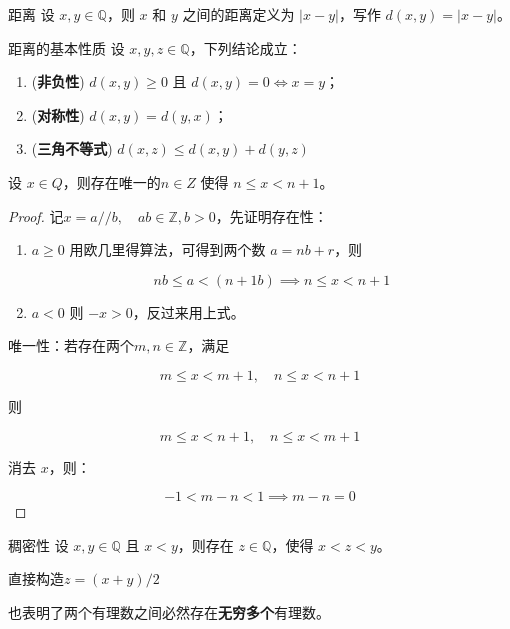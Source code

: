 \begin{definition}{距离}{}
	设 $x,y\in \mathbb Q$，则 $x$ 和 $y$ 之间的距离定义为 $|x-y|$，写作 $d(x,y)=|x-y|$。
\end{definition}

\begin{theorem}{距离的基本性质}{}
	设 $x,y,z\in \mathbb Q$，下列结论成立：
	\begin{enumerate}
		\item (\textbf{非负性}) $d(x,y)\ge 0$ 且 $d(x,y)=0\iff x=y$；
		\item (\textbf{对称性}) $d(x,y) = d(y,x)$；
		\item (\textbf{三角不等式}) $d(x,z) \le d(x,y) + d(y,z)$
	\end{enumerate}
\end{theorem}

\begin{theorem}{}{}
	设 $x\in Q$，则存在唯一的$n\in Z$ 使得 $n\le x < n+1$。
\end{theorem}

\begin{proof} 
	记$x = a//b,\quad ab\in\mathbb Z,b>0$，先证明存在性：

\begin{enumerate}
	\item $a\ge 0$ 用欧几里得算法，可得到两个数 $a=nb+r$，则
	
	$$
	nb \le a < (n+1b)\implies n\le x < n+1
	$$
	\item $a < 0$ 则 $-x > 0$，反过来用上式。
\end{enumerate}	

\noindent 唯一性：若存在两个$m,n\in \mathbb Z$，满足

$$
m\le x < m+1, \quad n\le x < n+1
$$

\noindent 则

$$
m \le x < n+1, \quad n \le x < m+1
$$

\noindent 消去 $x$，则：

$$
-1<m-n<1\implies m-n=0
$$
\end{proof}

\begin{theorem}{稠密性}{}
	设 $x,y\in \mathbb Q$ 且 $x < y$，则存在 $z\in \mathbb Q$，使得 $x<z<y$。
\end{theorem}

\begin{note}
	直接构造$z=(x+y)/2$
\end{note}

\begin{note}
	也表明了两个有理数之间必然存在\textbf{无穷多个}有理数。
\end{note}




















